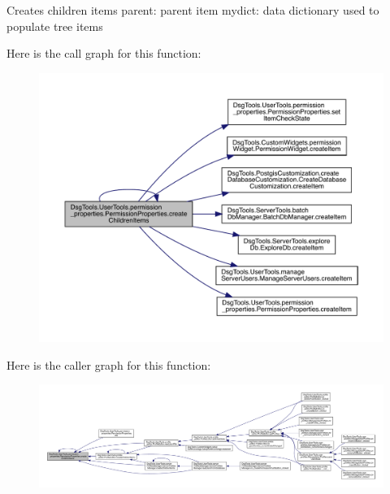 \begin{DoxyVerb}Creates children items
parent: parent item
mydict: data dictionary used to populate tree items
\end{DoxyVerb}
 Here is the call graph for this function\+:
\nopagebreak
\begin{figure}[H]
\begin{center}
\leavevmode
\includegraphics[width=350pt]{class_dsg_tools_1_1_user_tools_1_1permission__properties_1_1_permission_properties_a6eb2030f5764ee9d607271c96e5ad2a5_cgraph}
\end{center}
\end{figure}
Here is the caller graph for this function\+:
\nopagebreak
\begin{figure}[H]
\begin{center}
\leavevmode
\includegraphics[width=350pt]{class_dsg_tools_1_1_user_tools_1_1permission__properties_1_1_permission_properties_a6eb2030f5764ee9d607271c96e5ad2a5_icgraph}
\end{center}
\end{figure}
\mbox{\label{class_dsg_tools_1_1_user_tools_1_1permission__properties_1_1_permission_properties_ab5156b62b30098783bef4e10891632ff}} 
